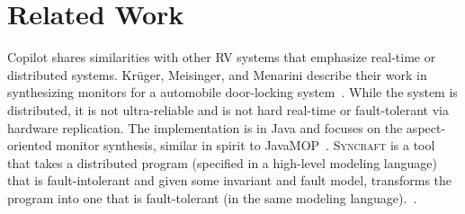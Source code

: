 \section{Related Work}\label{sec:related}




Copilot shares similarities with other RV systems that emphasize real-time or
distributed systems.  Kr\"{u}ger, Meisinger, and Menarini describe their work in
synthesizing monitors for a automobile door-locking system~\cite{msc}.  While
the system is distributed, it is not ultra-reliable and is not hard real-time or
fault-tolerant via hardware replication.  The implementation is in Java and
focuses on the aspect-oriented monitor synthesis, similar in spirit to
JavaMOP~\cite{javamop}.  \textsc{Syncraft} is a tool that takes a distributed
program (specified in a high-level modeling language) that is fault-intolerant
and given some invariant and fault model, transforms the program into one that
is fault-tolerant (in the same modeling language).~\cite{syncraft}.  %

